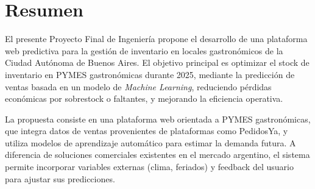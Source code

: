 \chapter*{Resumen}

El presente Proyecto Final de Ingeniería propone el desarrollo de una plataforma web predictiva para la gestión de inventario en locales gastronómicos de la Ciudad Autónoma de Buenos Aires. El objetivo principal es optimizar el stock de inventario en PYMES gastronómicas durante 2025, mediante la predicción de ventas basada en un modelo de \emph{Machine Learning}, reduciendo pérdidas económicas por sobrestock o faltantes, y mejorando la eficiencia operativa.

La propuesta consiste en una plataforma web orientada a PYMES gastronómicas, que integra datos de ventas provenientes de plataformas como PedidosYa, y utiliza modelos de aprendizaje automático para estimar la demanda futura. A diferencia de soluciones comerciales existentes en el mercado argentino, el sistema permite incorporar variables externas (clima, feriados) y feedback del usuario para ajustar sus predicciones.











